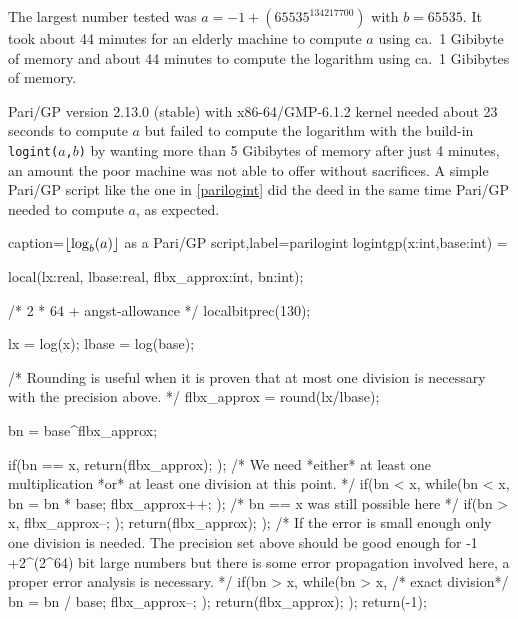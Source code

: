 The largest number tested was $a = -1 + (65535^134217700)$ with $b = 65535$. It took
about 44 minutes for an elderly machine to compute $a$ using ca.~1 Gibibyte of memory
and about 44 minutes to compute the logarithm using ca.~1 Gibibytes of memory.

Pari/GP version 2.13.0 (stable) with x86-64/GMP-6.1.2 kernel needed about 23 seconds
to compute $a$ but failed to compute the logarithm with the build-in \texttt{logint($a$,$b$)}
by wanting more than 5 Gibibytes of memory after just 4 minutes, an amount the poor machine
was not able to offer without sacrifices. A simple Pari/GP script like the one in
\ref{parilogint} did the deed in the same time Pari/GP needed to compute $a$, as expected.

\lstset{language=pari,style=code}
\begin{pblisting}{caption={$\floor{\log_b(a)}$ as a Pari/GP script},label=parilogint}
logintgp(x:int,base:int) = {
   local(lx:real, lbase:real, flbx_approx:int, bn:int);

   /* 2 * 64 + angst-allowance */
   localbitprec(130);

   lx = log(x);
   lbase = log(base);

   /*
      Rounding is useful when it is proven that at most one
      division is necessary with the precision above.
    */
   flbx_approx = round(lx/lbase);

   bn = base^flbx_approx;

   if(bn == x,
      return(flbx_approx);
   );
   /* 
      We need *either* at least one multiplication *or* at least
      one division at this point.
    */
   if(bn < x,
      while(bn < x,
         bn = bn * base;
         flbx_approx++;
      );
      /* bn == x was still possible here */
      if(bn > x,
         flbx_approx--;
      );
      return(flbx_approx);
   );
   /*
    If the error is small enough only one division is needed.
    The precision set above should be good enough for -1 +2^(2^64) bit
    large numbers but there is some error propagation involved here,
    a proper error analysis is necessary.
   */
   if(bn > x,
      while(bn > x,
         /* exact division*/
         bn = bn / base;
         flbx_approx--;
      );
      return(flbx_approx);
    );
    return(-1);
}
\end{pblisting}


